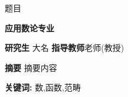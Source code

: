 \newpage
\thispagestyle{empty} %

    \centerline{题目}
\begin{center}
    {\textbf{应用数论专业}}
\end{center}

\begin{center}
    \hspace{1cm} \textbf{研究生} \quad 大名 \hspace{1.5cm} \textbf{指导教师}\quad 老师(教授)
\end{center}

\vskip 10bp
{
\hspace{5bp}\textbf{摘要}
摘要内容

\vskip 10bp

\hspace{5bp}\textbf{关键词:}
\quad 数,函数,范畴

}
